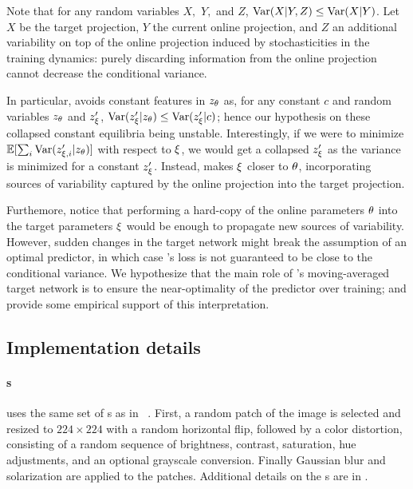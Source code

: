 Note that for any random variables $X,$ $Y,$ and $Z$, $\operatorname*{Var}(X|Y,Z) \leq \operatorname*{Var}(X|Y)$. Let $X$ be the target projection, $Y$ the current online projection, and $Z$ an additional variability on top of the online projection induced by stochasticities in the training dynamics: purely discarding information from the online projection cannot decrease the conditional variance. 

In particular, \algo avoids constant features in $z_{\theta}$ 
as, for any constant $c$ and random variables $z_{\theta}$ and $z'_\xi$, $\operatorname*{Var}(z'_\xi | z_{\theta}) \leq \operatorname*{Var}(z'_\xi | c)$;  hence our hypothesis on these collapsed constant equilibria being unstable. Interestingly, if we were to minimize $\mathbb{E}[\sum_i \operatorname*{Var}(z'_{\xi, i} | z_{\theta})]$ with respect to $\xi$, we would get a collapsed $z'_\xi$ as the variance is minimized for a constant $z'_\xi$. 
Instead, \algo makes $\xi$ closer to ${\theta}$, incorporating sources of variability captured by the online projection into the target projection. 

Furthemore, notice that performing a hard-copy of the online parameters ${\theta}$ into the target parameters $\xi$ would be enough to propagate new sources of variability. However, sudden changes in the target network might break the assumption of an optimal predictor, in which case \algo's loss is not guaranteed to be close to the conditional variance. We hypothesize that the main role of \algo's moving-averaged target network is to ensure the near-optimality of the predictor over training;  and  provide some empirical support of this interpretation.

\subsection{Implementation details}
\label{sec:impl_detail}
\paragraph{\Imageaugmentation s} \algo uses the same set of \imageaugmentation s as in \simclr~\cite{SimCLR}. First, a random patch of the image is selected and resized to $224 \times 224$ with a random horizontal flip, followed by a color distortion, consisting of a random sequence of brightness, contrast, saturation, hue adjustments, and an optional grayscale conversion. Finally Gaussian blur and solarization are applied to the patches. Additional details on the \imageaugmentation s are in .
